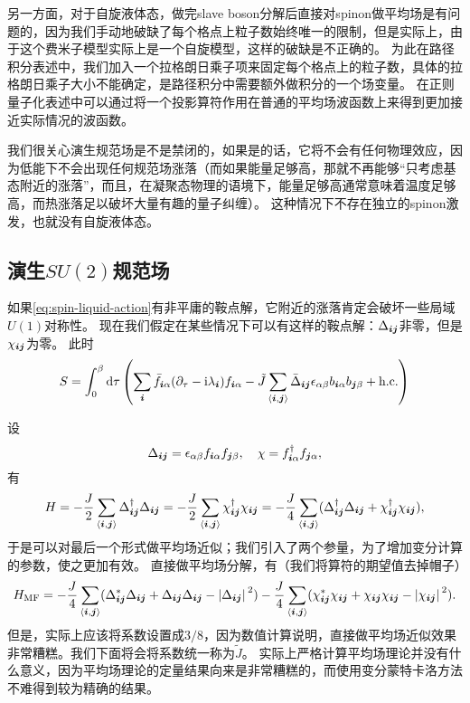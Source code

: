 另一方面，对于自旋液体态，做完slave boson分解后直接对spinon做平均场是有问题的，因为我们手动地破缺了每个格点上粒子数始终唯一的限制，但是实际上，由于这个费米子模型实际上是一个自旋模型，这样的破缺是不正确的。
为此在路径积分表述中，我们加入一个拉格朗日乘子项来固定每个格点上的粒子数，具体的拉格朗日乘子大小不能确定，是路径积分中需要额外做积分的一个场变量。
在正则量子化表述中可以通过将一个投影算符作用在普通的平均场波函数上来得到更加接近实际情况的波函数。

我们很关心演生规范场是不是禁闭的，如果是的话，它将不会有任何物理效应，因为低能下不会出现任何规范场涨落（而如果能量足够高，那就不再能够“只考虑基态附近的涨落”，而且，在凝聚态物理的语境下，能量足够高通常意味着温度足够高，而热涨落足以破坏大量有趣的量子纠缠）。
这种情况下不存在独立的spinon激发，也就没有自旋液体态。

\subsection{演生$SU(2)$规范场}

如果\eqref{eq:spin-liquid-action}有非平庸的鞍点解，它附近的涨落肯定会破坏一些局域$U(1)$对称性。
现在我们假定在某些情况下可以有这样的鞍点解：$\Delta_{\vb*{i} \vb*{j}}$非零，但是$\chi_{\vb*{i} \vb*{j}}$为零。
此时
\begin{equation}
    S = \int_0^\beta \dd{\tau} \left( \sum_{\vb*{i}} \bar{f}_{\vb*{i} \alpha} (\partial_\tau - \mathrm{i} \lambda_{\vb*{i}}) f_{\vb*{i} \alpha} - \tilde{J} \sum_{\langle \vb*{i}, \vb*{j} \rangle} \bar{\Delta}_{\vb*{i} \vb*{j}} \epsilon_{\alpha \beta} b_{\vb*{i} \alpha} b_{\vb*{j} \beta} + \text{h.c.} \right)
\end{equation}

设
\begin{equation}
    {\Delta}_{\vb*{i} \vb*{j}} = \epsilon_{\alpha \beta} {f}_{\vb*{i} \alpha} {f}_{\vb*{j} \beta}, \quad {\chi} = {f}^\dagger_{\vb*{i} \alpha} {f}_{\vb*{j} \alpha},
\end{equation}
有
\begin{equation}
    {H} = - \frac{J}{2} \sum_{\langle \vb*{i}, \vb*{j} \rangle} {\Delta}^\dagger_{\vb*{i} \vb*{j}} {\Delta}_{\vb*{i} \vb*{j}} = - \frac{J}{2} \sum_{\langle \vb*{i}, \vb*{j} \rangle} {\chi}_{\vb*{i} \vb*{j}}^\dagger {\chi}_{\vb*{i} \vb*{j}} = - \frac{J}{4} \sum_{\langle \vb*{i}, \vb*{j} \rangle} ({\Delta}^\dagger_{\vb*{i} \vb*{j}} {\Delta}_{\vb*{i} \vb*{j}} + {\chi}^\dagger_{\vb*{i} \vb*{j}} {\chi}_{\vb*{i} \vb*{j}}),
\end{equation}
于是可以对最后一个形式做平均场近似；我们引入了两个参量，为了增加变分计算的参数，使之更加有效。
直接做平均场分解，有（我们将算符的期望值去掉帽子）
\[
    {H}_\text{MF} = - \frac{J}{4} \sum_{\langle \vb*{i}, \vb*{j} \rangle} (\Delta_{\vb*{i} \vb*{j}}^* {\Delta}_{\vb*{i} \vb*{j}} + {\Delta}_{\vb*{i} \vb*{j}} \Delta_{\vb*{i} \vb*{j}} - \abs*{\Delta_{\vb*{i} \vb*{j}}}^2) - \frac{J}{4} \sum_{\langle \vb*{i}, \vb*{j} \rangle} (\chi_{\vb*{i} \vb*{j}}^* {\chi}_{\vb*{i} \vb*{j}} + {\chi}_{\vb*{i} \vb*{j}} \chi_{\vb*{i} \vb*{j}} - \abs*{\chi_{\vb*{i} \vb*{j}}}^2).
\]
但是，实际上应该将系数设置成$3/8$，因为数值计算说明，直接做平均场近似效果非常糟糕。我们下面将会将系数统一称为$\tilde{J}$。
实际上严格计算平均场理论并没有什么意义，因为平均场理论的定量结果向来是非常糟糕的，而使用变分蒙特卡洛方法不难得到较为精确的结果。

